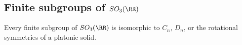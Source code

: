 \subsection{Finite subgroups of $SO_3(\RR)$}

\begin{theorem}
\thmlabel

Every finite subgroup of $SO_3(\RR)$ is isomorphic to $C_n$, $D_n$, or the rotational symmetries of a platonic solid. 
\end{theorem}

